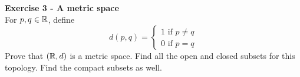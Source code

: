 \documentclass[12pt,a4paper]{article}
\begin{document}
\bigskip



\textbf{Exercise 3 - A metric space}\\
For $p,q\in \mathbb{R}$, define
$$d(p,q)=\left\{
\begin{array}{l}
1 \text{ if } p\neq q\\
0 \text{ if } p= q
\end{array}\right.$$
Prove that $(\mathbb{R},d)$ is a metric space. Find all the open and closed subsets for this topology. Find the compact subsets as well.
\end{document}
